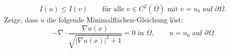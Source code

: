 \documentclass{scrartcl}
\newcommand{\abs}[1]{\left\lvert #1 \right\rvert}
\newcommand{\Rand}[1]{\partial #1}
\newcommand{\closure}[1]{\overline{#1}}
\begin{document}
  \begin{equation}
    I(u) \leq I(v)
    \qquad
    \text{für alle } v
    \in
    C^2(\closure{\Omega})
    \text{ mit } v = u_0 \text{ auf } \Rand {\Omega}.
  \end{equation}
  Zeige, dass $u$ die folgende Minimalflächen-Gleichung löst:
  \begin{equation}
    - \nabla
    \cdot
    \frac
      {\nabla u(x)}
      {\sqrt{\abs{\nabla u(x)}^2 + 1}}
    = 0 \text{ in } \Omega, \qquad u = u_0 \text{ auf } \Rand{\Omega}
  \end{equation}
\end{document}

